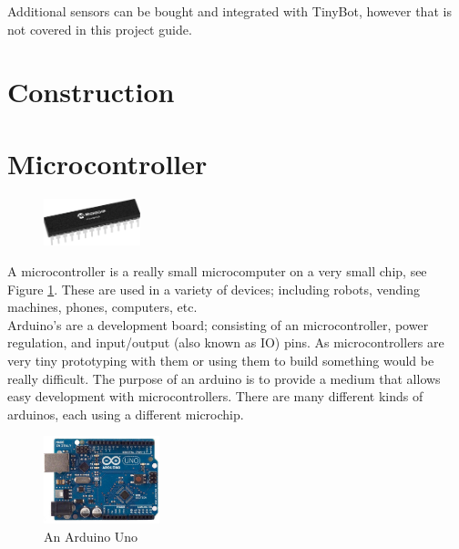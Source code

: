 \documentclass[a4paper,12pt]{article}
\begin{document}
\bigskip

Additional sensors can be bought and integrated with TinyBot, however that is not covered in this project guide. 

\section{Construction}

\pagebreak
\section{Microcontroller} \label{sec:microcontroller}
\begin{figure}
    \includegraphics[width=0.25\textwidth]{medium-ATmega328-SPDIP-28.png}
    \label{fig:microchip}
\end{figure}

A microcontroller is a really small microcomputer on a very small chip, see Figure \ref{fig:microchip}.
These are used in a variety of devices; including robots, vending machines, phones, computers, etc. \\

Arduino's are a development board; consisting of an microcontroller, power regulation, and input/output (also known as IO) pins. As microcontrollers are very tiny prototyping with them or using them to build something would be really difficult. The purpose of an arduino is to provide a medium that allows easy development with microcontrollers. There are many different kinds of arduinos, each using a different microchip. \\

\begin{figure}
    \centering
    \vspace{-0.5cm}
    \includegraphics[width=0.3\textwidth]{arduino-uno.jpg}
    \caption{An Arduino Uno}
    \label{fig:arduino-real}
\end{figure}
\end{document}
